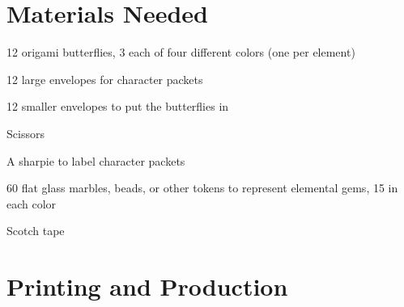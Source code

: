 \documentclass[sheet]{iron}
\begin{document}

\section{Materials Needed}

\begin{itemz}
\item 12 origami butterflies, 3 each of four different colors (one per element)
\item 12 large envelopes for character packets
\item 12 smaller envelopes to put the butterflies in
\item Scissors
\item A sharpie to label character packets
\end{itemz}

\begin{itemz}
\item 60 flat glass marbles, beads, or other tokens to represent elemental
  gems, 15 in each color
\item Scotch tape
\end{itemz}

\section{Printing and Production}
\end{document}
